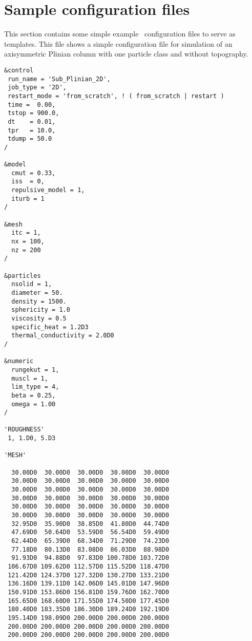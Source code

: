 \section{Sample configuration files}
\label{section:sample}
This section contains some simple example \PDAC\ configuration files to serve
as templates.
\prettypar
This file shows a simple configuration file for simulation of an axisymmetric
Plinian column with one particle class and without topography.  

\begin{verbatim}
&control
 run_name = 'Sub_Plinian_2D',
 job_type = '2D',
 restart_mode = 'from_scratch', ! ( from_scratch | restart )
 time =  0.00,
 tstop = 900.0,
 dt    = 0.01,
 tpr   = 10.0,
 tdump = 50.0
/

&model
  cmut = 0.33,
  iss  = 0,
  repulsive_model = 1,
  iturb = 1
/

&mesh
  itc = 1, 
  nx = 100,
  nz = 200
/

&particles
  nsolid = 1, 
  diameter = 50.
  density = 1500.
  sphericity = 1.0
  viscosity = 0.5
  specific_heat = 1.2D3
  thermal_conductivity = 2.0D0
/

&numeric
  rungekut = 1,
  muscl = 1,
  lim_type = 4,
  beta = 0.25,
  omega = 1.00
/

'ROUGHNESS'
 1, 1.D0, 5.D3

'MESH'

  30.00D0  30.00D0  30.00D0  30.00D0  30.00D0
  30.00D0  30.00D0  30.00D0  30.00D0  30.00D0
  30.00D0  30.00D0  30.00D0  30.00D0  30.00D0
  30.00D0  30.00D0  30.00D0  30.00D0  30.00D0
  30.00D0  30.00D0  30.00D0  30.00D0  30.00D0
  30.00D0  30.00D0  30.00D0  30.00D0  30.00D0
  32.95D0  35.90D0  38.85D0  41.80D0  44.74D0
  47.69D0  50.64D0  53.59D0  56.54D0  59.49D0
  62.44D0  65.39D0  68.34D0  71.29D0  74.23D0
  77.18D0  80.13D0  83.08D0  86.03D0  88.98D0
  91.93D0  94.88D0  97.83D0 100.78D0 103.72D0
 106.67D0 109.62D0 112.57D0 115.52D0 118.47D0
 121.42D0 124.37D0 127.32D0 130.27D0 133.21D0
 136.16D0 139.11D0 142.06D0 145.01D0 147.96D0
 150.91D0 153.86D0 156.81D0 159.76D0 162.70D0
 165.65D0 168.60D0 171.55D0 174.50D0 177.45D0
 180.40D0 183.35D0 186.30D0 189.24D0 192.19D0
 195.14D0 198.09D0 200.00D0 200.00D0 200.00D0
 200.00D0 200.00D0 200.00D0 200.00D0 200.00D0
 200.00D0 200.00D0 200.00D0 200.00D0 200.00D0


\end{verbatim}
